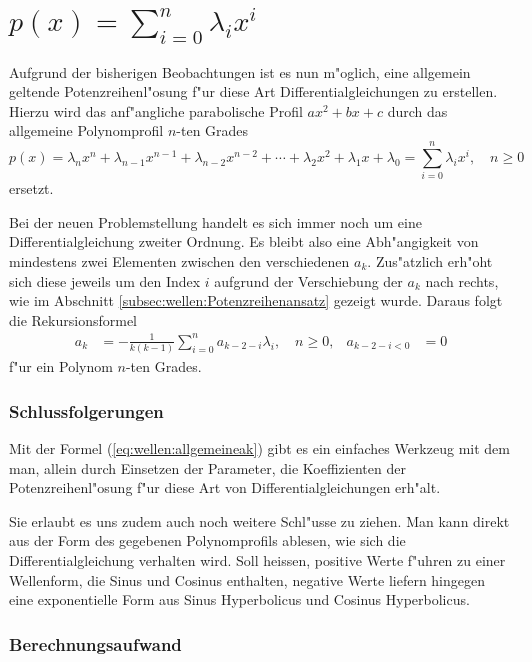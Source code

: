 \section{\texorpdfstring{$p(x) = \sum_{i=0}^{n}\lambda_ix^i$}{p(x) = summe i = 
0 bis n lambdai xi}}

Aufgrund der bisherigen Beobachtungen ist es nun m"oglich, eine 
allgemein geltende Potenzreihenl"osung f"ur diese Art Differentialgleichungen 
zu erstellen. Hierzu wird das anf"angliche parabolische Profil $ax^2 + bx + c$ 
durch das allgemeine Polynomprofil $n$-ten Grades
\begin{equation*}
	p(x) =
	\lambda_nx^n + \lambda_{n-1}x^{n-1} + \lambda_{n-2}x^{n-2} + \dotsb + 
	\lambda_2x^2 + \lambda_1x + \lambda_0 = \sum_{i=0}^{n}\lambda_ix^i, \quad n 
	\ge 0
\end{equation*}
ersetzt.

Bei der neuen Problemstellung handelt es sich immer noch um eine 
Differentialgleichung zweiter Ordnung. Es bleibt also eine Abh"angigkeit von 
mindestens zwei Elementen zwischen den verschiedenen $a_k$. Zus"atzlich erh"oht 
sich diese jeweils um den Index $i$ aufgrund der Verschiebung der $a_k$ nach 
rechts, wie im Abschnitt \ref{subsec:wellen:Potenzreihenansatz} gezeigt wurde. 
Daraus folgt die Rekursionsformel
%
\begin{align}
	a_k &= -\frac{1}{k(k-1)}\sum_{i=0}^{n}a_{k-2-i}\lambda_i, \quad n \ge 0, 
	&a_{k-2-i < 0} &=  0
	\label{eq:wellen:allgemeineak}
\end{align}
f"ur ein Polynom $n$-ten Grades.

\subsubsection{Schlussfolgerungen}

Mit der Formel (\ref{eq:wellen:allgemeineak}) gibt es ein einfaches 
Werkzeug mit dem man, allein durch Einsetzen der Parameter, die Koeffizienten 
der Potenzreihenl"osung f"ur diese Art von Differentialgleichungen erh"alt.

Sie erlaubt es uns zudem auch noch weitere Schl"usse zu ziehen. Man kann direkt 
aus der Form des gegebenen Polynomprofils ablesen, wie sich die 
Differentialgleichung verhalten wird. Soll heissen, positive Werte
f"uhren zu einer Wellenform, die Sinus und Cosinus enthalten, negative 
Werte liefern hingegen eine exponentielle Form aus Sinus Hyperbolicus und 
Cosinus Hyperbolicus.

\subsubsection{Berechnungsaufwand}








